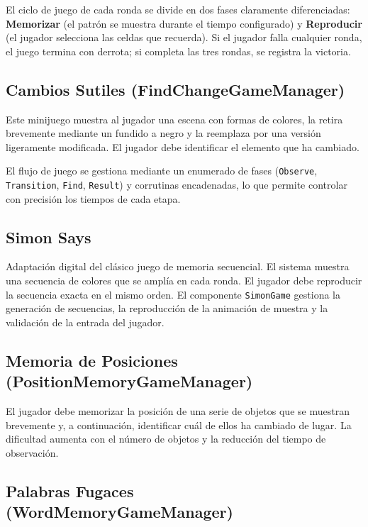 \documentclass[12pt, a4paper]{report}
\begin{document}
El ciclo de juego de cada ronda se divide en dos fases claramente diferenciadas:
\textbf{Memorizar} (el patrón se muestra durante el tiempo configurado) y
\textbf{Reproducir} (el jugador selecciona las celdas que recuerda). Si el
jugador falla cualquier ronda, el juego termina con derrota; si completa las
tres rondas, se registra la victoria.

\subsection{Cambios Sutiles (FindChangeGameManager)}

Este minijuego muestra al jugador una escena con formas de colores, la retira
brevemente mediante un fundido a negro y la reemplaza por una versión
ligeramente modificada. El jugador debe identificar el elemento que ha cambiado.

El flujo de juego se gestiona mediante un enumerado de fases
(\texttt{Observe}, \texttt{Transition}, \texttt{Find}, \texttt{Result})
y corrutinas encadenadas, lo que permite controlar con precisión los tiempos
de cada etapa.

\subsection{Simon Says}

Adaptación digital del clásico juego de memoria secuencial. El sistema muestra
una secuencia de colores que se amplía en cada ronda. El jugador debe reproducir
la secuencia exacta en el mismo orden. El componente \texttt{SimonGame} gestiona
la generación de secuencias, la reproducción de la animación de muestra y la
validación de la entrada del jugador.

\subsection{Memoria de Posiciones (PositionMemoryGameManager)}

El jugador debe memorizar la posición de una serie de objetos que se muestran
brevemente y, a continuación, identificar cuál de ellos ha cambiado de lugar.
La dificultad aumenta con el número de objetos y la reducción del tiempo de
observación.

\subsection{Palabras Fugaces (WordMemoryGameManager)}
\end{document}
